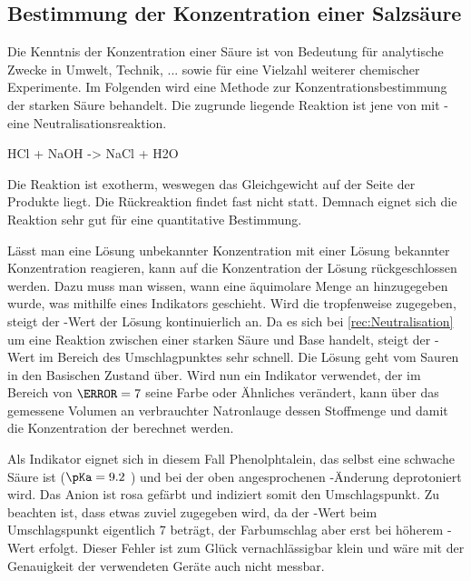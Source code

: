 \documentclass{article}
\begin{document}
    \pagebreak
    
    \subsection{Bestimmung der Konzentration einer Salzsäure}
      
      Die Kenntnis der Konzentration einer Säure ist von Bedeutung für analytische Zwecke in Umwelt, Technik, ... sowie für eine Vielzahl weiterer chemischer Experimente. Im Folgenden wird eine Methode zur Konzentrationsbestimmung der starken Säure  behandelt. Die zugrunde liegende Reaktion ist jene von  mit  - eine Neutralisationsreaktion.
        
        \begin{reaction}
          HCl\aq{} + NaOH\aq{} -> NaCl\aq{} + H2O \label{rec:Neutralisation}        
        \end{reaction}
        
        Die Reaktion ist exotherm, weswegen das Gleichgewicht auf der Seite der Produkte liegt. Die Rückreaktion findet fast nicht statt. Demnach eignet sich die Reaktion sehr gut für eine quantitative Bestimmung.
        
        Lässt man eine  Lösung unbekannter Konzentration mit einer  Lösung bekannter Konzentration reagieren, kann auf die Konzentration der  Lösung rückgeschlossen werden. Dazu muss man wissen, wann eine äquimolare Menge an  hinzugegeben wurde, was mithilfe eines Indikators geschieht. Wird die  tropfenweise zugegeben, steigt der \pH-Wert der Lösung kontinuierlich an. Da es sich bei \ref{rec:Neutralisation} um eine Reaktion zwischen einer starken Säure und Base handelt, steigt der \pH-Wert im Bereich des Umschlagpunktes sehr schnell. Die Lösung geht vom Sauren in den Basischen Zustand über. Wird nun ein Indikator verwendet, der im Bereich von $\pH=7$ seine Farbe oder Ähnliches verändert, kann über das gemessene Volumen an verbrauchter Natronlauge dessen Stoffmenge und damit die Konzentration der  berechnet werden.
        
        Als Indikator eignet sich in diesem Fall Phenolphtalein, das selbst eine schwache Säure ist ($\pKa = 9.2$ \cite{Phenolphtalein}) und bei der oben angesprochenen \pH-Änderung deprotoniert wird. Das Anion ist rosa gefärbt und indiziert somit den Umschlagspunkt. Zu beachten ist, dass etwas zuviel  zugegeben wird, da der \pH-Wert beim Umschlagspunkt eigentlich 7 beträgt, der Farbumschlag aber erst bei höherem \pH-Wert erfolgt. Dieser Fehler ist zum Glück vernachlässigbar klein und wäre mit der Genauigkeit der verwendeten Geräte auch nicht messbar. \label{seite}
        
\end{document}

